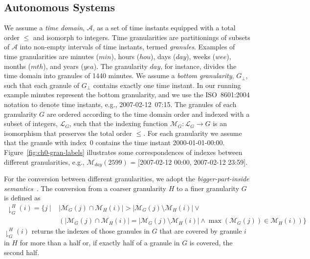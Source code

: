 \documentclass[abstracton,12pt]{scrreprt}
\begin{document}
\subsection{Autonomous Systems}

We assume a \emph{time domain}, $\mathcal{A}$, as a set of time
instants equipped with a total order $\leq$ and isomorph to integers.
Time granularities are partitionings of subsets of $\mathcal{A}$ into
non-empty intervals of time instants, termed \emph{granules}.
Examples of time granularities are minutes ($\mathit{min}$), hours
($\mathit{hou}$), days ($\mathit{day}$), weeks ($\mathit{wee}$),
months ($\mathit{mth}$), and years ($\mathit{yea}$).  The granularity
$\mathit{day}$, for instance, divides the time domain into granules of
1440 minutes.  We assume a \emph{bottom granularity}, $G_\bot$, such
that each granule of $G_\bot$ contains exactly one time instant.  In
our running example minutes represent the bottom granularity, and we
use the ISO~8601:2004 notation to denote time instants, e.g.,
\mbox{2007-02-12 07:15}.  The granules of each granularity $G$ are
ordered according to the time domain order and indexed with a subset
of integers, $\mathcal{L}_G$, such that the indexing function
$\mathcal{M}_G : \mathcal{L}_G \to G$ is an isomorphism that preserves
the total order $\leq$. For each granularity we assume that the
granule with index~0 contains the time instant 2000-01-01-00:00.
Figure~\ref{fig:ch0-gran-labels} illustrates some correspondences of
indexes between different granularities, e.g.,
$\mathcal{M}_\mathit{day}(2599)$ = [2007-02-12 00:00, 2007-02-12
23:59].

For the conversion between different granularities, we adopt the
\emph{bigger-part-inside semantics}~\cite{Ohlbach06,ical98}.  The
conversion from a coarser granularity $H$ to a finer granularity $G$
is defined as
\begin{align*}
  \downharpoonright^{H}_{G}(i) = \{ j \mid
  & |\mathcal{M}_{G}(j) \cap
  \mathcal{M}_{H}(i)| > |\mathcal{M}_{G}(j) \setminus
  \mathcal{M}_{H}(i)| \lor {}
  \\
  & (|\mathcal{M}_{G}(j) \cap \mathcal{M}_{H}(i)| =
  |\mathcal{M}_{G}(j) \setminus \mathcal{M}_{H}(i)| \land
  \max(\mathcal{M}_{G}(j)) \in \mathcal{M}_{H}(i) )\}
\end{align*}
$\downharpoonright^{H}_{G}(i)$ returns the indexes of those granules
in $G$ that are covered by granule $i$ in $H$ for more than a half or,
if exactly half of a granule in $G$ is covered, the second half.
\end{document}
